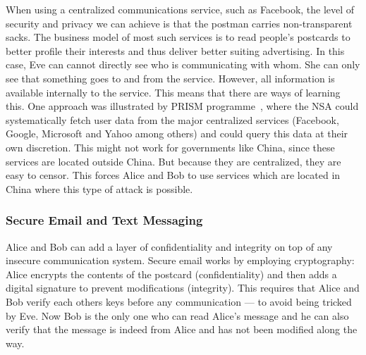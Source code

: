 When using a centralized communications service, such as Facebook, the
level of security and privacy we can achieve is that the postman
carries non-transparent sacks.  The business model of most such
services is to read people's postcards to better profile their
interests and thus deliver better suiting advertising.
In this case, Eve can cannot directly see who is communicating with whom.
She can only see that something goes to and from the service.
However, all information is available
internally to the service.  This means that there are ways of learning
this.
One approach was illustrated by  PRISM programme~\cite{Prism}, where 
the \ac{NSA} could systematically fetch user data from the major centralized 
services (Facebook, Google, Microsoft and Yahoo among others) and could query 
this data at their own discretion.
This might not work for governments like China, since these services are 
located outside China.
But because they are centralized, they are easy to censor.
This forces Alice and Bob to use services which are located in China where this 
type of attack is possible.

\subsubsection{Secure Email and Text Messaging}

Alice and Bob can add a layer of confidentiality and integrity on top of any 
insecure communication system.
Secure email works by employing cryptography: Alice encrypts the contents of 
the postcard (confidentiality) and then adds a digital signature to prevent 
modifications (integrity).
This requires that Alice and Bob verify each others keys before any 
communication --- to avoid being tricked by Eve.
Now Bob is the only one who can read Alice's message and he can also verify 
that the message is indeed from Alice and has not been modified along the way.


